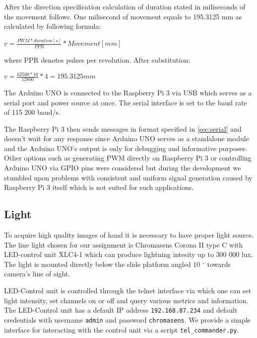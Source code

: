 After the direction specification calculation of duration  stated in miliseconds of the movement follows. One milisecond of movement equals to 195.3125 mm as calculated by following formula:\\
\begin{centering}
    $v = \frac{PWM * duration [s]}{PPR} * Movement [mm]$ \\
\end{centering}
where PPR denotes pulses per revolution. After substitution: \\
\begin{centering}
    $v = \frac{62500 * 10}{12800} * 4 = 195.3125 mm$ \\
\end{centering}

The Arduino UNO is connected to the Raspberry Pi 3 via USB which serves as a serial port and power source at once. The serial interface is set to the baud rate of 115 200 baud/s.

The Raspberry Pi 3 then sends messages in format specified in \ref{sec:serial} and doesn't wait for any response since Arduino UNO serves as a standalone module and the Arduino UNO's output is only for debugging and informative purposes. Other options such as generating PWM directly on Raspberry Pi 3 or controlling Arduino UNO via GPIO pins were considered but during the development we stumbled upon problems with consistent and uniform signal generation caused by Raspberry Pi 3 itself which is not suited for such applications.

\subsection{Light}
To acquire high quality images of hand it is necessary to have proper light source. The line light chosen for our assignment is Chromasens Corona II type C with LED-control unit XLC4-1 which can produce lightning intesity up to 300 000 lux. The light is mounted directly below the slide platform angled 10 $^{\circ}$ towards camera's line of sight.

LED-Control unit is controlled through the telnet interface via which one can set light intensity, set channels on or off and query various metrics and information. The LED-Control unit has a default IP address \texttt{192.168.87.234} and default credentials with username \texttt{admin} and password \texttt{chromasens}. We provide a simple interface for interacting with the control unit via a script \texttt{tel\_commander.py}.

